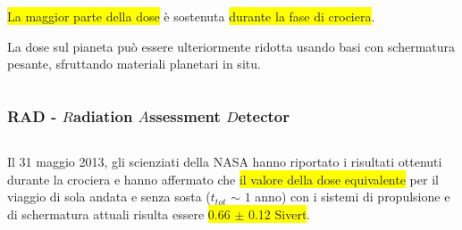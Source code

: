 \documentclass[9pt]{beamer}
\begin{document}
\begin{frame} [fragile]
\begin{columns}
\begin{column}{0.50\textwidth}
\colorbox{yellow}{La maggior parte della dose} \`e sostenuta \colorbox{yellow} {durante la fase di crociera}. 
\newline

La dose sul pianeta pu\`o essere ulteriormente ridotta usando basi con schermatura pesante, sfruttando materiali planetari in situ.
    \end{column}
\end{columns}
\end{frame}





\begin{frame} [fragile]
	\frametitle{RAD - $R$adiation $A$ssessment $D$etector}
\begin{columns}
  \begin{column}{0.50\textwidth}
Il 31 maggio 2013, gli scienziati della NASA hanno riportato i risultati ottenuti durante la crociera e hanno affermato che \colorbox{yellow}{il valore della dose equivalente} per il viaggio di sola andata e senza sosta ($t_{tot}$ $\sim$ $1$ anno) con i sistemi di propulsione e di schermatura attuali risulta essere  \colorbox{yellow}{0.66 $\pm$ 0.12 Sivert}. 
\newline


\end{column}
\end{columns}
\end{frame}
\end{document}
